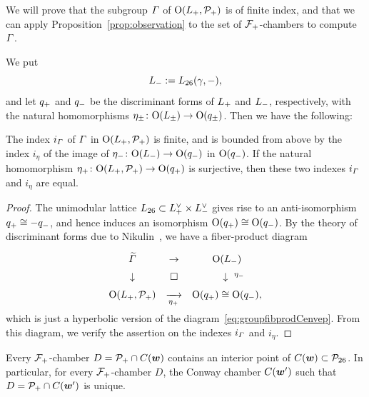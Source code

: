 \documentclass{amsart} %
\begin{document}
We will prove that 
the subgroup $\varGamma$ of $ \mathord{\mathrm{O}}(L_{+}, \mathord{\mathcal{P}}_{+})$ is of finite index,
and that we can apply
Proposition~\ref{prop:observation}
to the set of $\mathord{\mathcal{F}}_{+}$-chambers
to compute $\varGamma$.
%
\par
We put 
\[
L_{-}:=L_{26}(\gamma, -),
\]
and let $q_{+}$ and $q_{-}$ be the discriminant forms 
of $L_{+}$ and $L_{-}$, respectively,
with the natural homomorphisms $\eta_{\pm}\colon \mathord{\mathrm{O}}(L_{\pm})\to \mathord{\mathrm{O}}(q_{\pm})$.
Then we have the following:
%
\begin{proposition}\label{prop:vGamindex}
The index $i_{\varGamma}$ of $\varGamma$ in $ \mathord{\mathrm{O}}(L_{+}, \mathord{\mathcal{P}}_{+})$
is finite, and is bounded from above by the index $i_{\eta}$ of the image 
of ${\eta}_{-}\colon \mathord{\mathrm{O}}(L_{-}) \to \mathord{\mathrm{O}}(q_{-})$ 
in $\mathord{\mathrm{O}}(q_{-})$.
If the natural homomorphism ${\eta}_{+}\colon \mathord{\mathrm{O}}(L_{+}, \mathord{\mathcal{P}}_{+}) \to \mathord{\mathrm{O}}(q_{+})$ is surjective, 
then these two indexes $i_{\varGamma}$ and $i_{\eta}$ are equal.
\end{proposition}
%
\begin{proof}
The unimodular lattice $L_{26}\subset L_{+}^{\vee}\times L_{-}^{\vee}$ 
gives rise to an anti-isomorphism $q_{+}\cong -q_{-}$, 
and hence induces an isomorphism
$\mathord{\mathrm{O}}(q_{+})\cong \mathord{\mathrm{O}}(q_{-})$.
By the theory of discriminant forms due to Nikulin~\cite{MR525944}, 
we have a fiber-product diagram
%
\begin{equation}\label{eq:groupfibprodP}
\renewcommand{\arraystretch}{1.5}
\begin{array}{ccc}
\tilvGam &\to & \OG(\Lminus) \\
\downarrow & \square& \downarrow\rlap{ ${}^{\etaminus}$} \\
\OG(\Lplus, \PPPplus) & \maprightsb{\etaplus} & \OG(\qplus)\cong \OG(\qminus), 
\end{array}
\end{equation}
% 
which is just 
a hyperbolic version of the diagram~\eqref{eq:groupfibprodCenvep}.
From this diagram, we verify the assertion on the indexes $i_{\varGamma}$ and $i_{\eta}$.
\end{proof}
%
%
%
%
%
\begin{proposition}\label{prop:interior}
Every $\mathord{\mathcal{F}}_{+}$-chamber $D=\mathord{\mathcal{P}}_{+} \cap \mathord{C}(\boldsymbol{w})$
contains an interior point of $ \mathord{C}(\boldsymbol{w}) \subset \mathord{\mathcal{P}}_{26}$.
In particular, for every $\mathord{\mathcal{F}}_{+}$-chamber $D$,
the Conway chamber $ \mathord{C}(\boldsymbol{w}^{\prime}) $
such that $D=\mathord{\mathcal{P}}_{+} \cap \mathord{C}(\boldsymbol{w}^{\prime})$ is unique.
\end{proposition}
\end{document}
